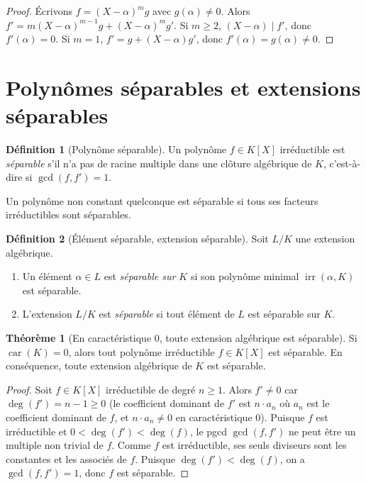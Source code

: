 \documentclass[12pt,a4paper,openany]{book}
\theoremstyle{definition}
\newtheorem{definition}{Définition}[chapter]
\newtheorem{theoreme}{Théorème}[chapter]
\newcommand{\car}{\operatorname{car}}
\newcommand{\irr}{\operatorname{irr}}
\renewcommand{\deg}{\operatorname{deg}}
\begin{document}
\begin{proof}
Écrivons $f = (X - \alpha)^m g$ avec $g(\alpha) \neq 0$. Alors
$f' = m(X-\alpha)^{m-1}g + (X-\alpha)^m g'$. Si $m \geq 2$,
$(X-\alpha) \mid f'$, donc $f'(\alpha) = 0$. Si $m = 1$,
$f' = g + (X-\alpha)g'$, donc $f'(\alpha) = g(\alpha) \neq 0$.
\end{proof}

\section{Polynômes séparables et extensions séparables}
\label{sec:separable}

\begin{definition}[Polynôme séparable]\label{def:poly-separable}
Un polynôme $f \in K[X]$ irréductible est \emph{séparable} s'il n'a pas de
racine multiple dans une clôture algébrique de $K$, c'est-à-dire si
$\gcd(f, f') = 1$.

Un polynôme non constant quelconque est séparable si tous ses facteurs
irréductibles sont séparables.
\end{definition}

\begin{definition}[Élément séparable, extension séparable]\label{def:ext-separable}
Soit $L/K$ une extension algébrique.
\begin{enumerate}[label=(\roman*)]
  \item Un élément $\alpha \in L$ est \emph{séparable sur $K$} si son polynôme
    minimal $\irr(\alpha, K)$ est séparable.
  \item L'extension $L/K$ est \emph{séparable} si tout élément de $L$ est
    séparable sur $K$.
\end{enumerate}
\end{definition}

\begin{theoreme}[En caractéristique $0$, toute extension algébrique est séparable]
\label{thm:car0-separable}
Si $\car(K) = 0$, alors tout polynôme irréductible $f \in K[X]$ est séparable.
En conséquence, toute extension algébrique de $K$ est séparable.
\end{theoreme}

\begin{proof}
Soit $f \in K[X]$ irréductible de degré $n \geq 1$. Alors
$f' \neq 0$ car $\deg(f') = n - 1 \geq 0$ (le coefficient dominant de $f'$ est
$n \cdot a_n$ où $a_n$ est le coefficient dominant de $f$, et $n \cdot a_n \neq 0$
en caractéristique $0$). Puisque $f$ est irréductible et $0 < \deg(f') < \deg(f)$,
le pgcd $\gcd(f, f')$ ne peut être un multiple non trivial de $f$. Comme $f$ est
irréductible, ses seuls diviseurs sont les constantes et les associés de $f$.
Puisque $\deg(f') < \deg(f)$, on a $\gcd(f, f') = 1$, donc $f$ est séparable.
\end{proof}
\end{document}
